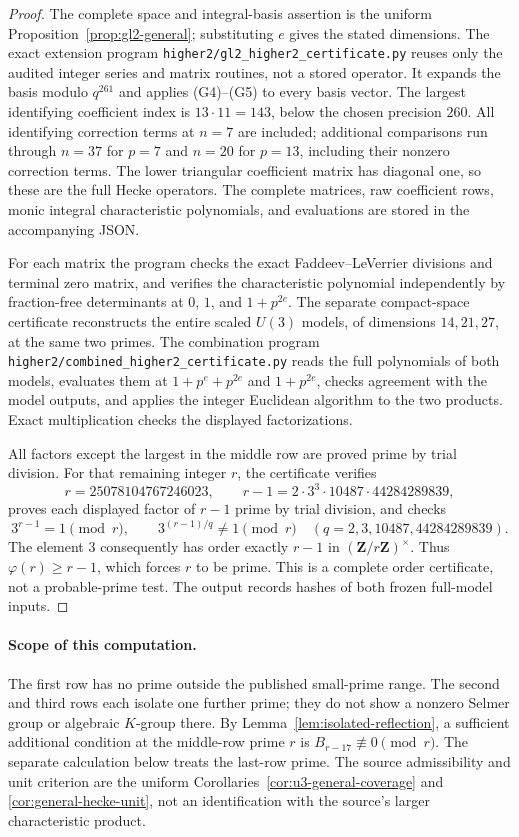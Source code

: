 \begin{proof}
The complete space and integral-basis assertion is the uniform
Proposition~\ref{prop:gl2-general}; substituting $e$ gives the stated
dimensions. The exact extension program
\texttt{higher2/gl2\_higher2\_certificate.py} reuses only the audited
integer series and matrix routines, not a stored operator.
It expands the basis modulo $q^{261}$ and applies (G4)--(G5)
to every basis vector.
The largest identifying coefficient index is $13\cdot11=143$,
below the chosen precision $260$.
All identifying correction terms at $n=7$ are included;
additional comparisons run through $n=37$ for $p=7$ and $n=20$
for $p=13$, including their nonzero correction terms.
The lower triangular coefficient matrix has diagonal one, so these
are the full Hecke operators. The complete matrices, raw coefficient
rows, monic integral characteristic polynomials, and evaluations are
stored in the accompanying JSON.

For each matrix the program checks the exact
Faddeev--LeVerrier divisions and terminal zero matrix, and verifies
the characteristic polynomial independently by fraction-free
determinants at $0$, $1$, and $1+p^{2e}$.
The separate compact-space certificate reconstructs the entire
scaled $U(3)$ models, of dimensions $14,21,27$, at the same two
primes. The combination program
\texttt{higher2/combined\_higher2\_certificate.py} reads the full
polynomials of both models, evaluates them at
$1+p^e+p^{2e}$ and $1+p^{2e}$, checks agreement with the model
outputs, and applies the integer Euclidean algorithm to the two
products. Exact multiplication checks the displayed factorizations.

All factors except the largest in the middle row are proved prime
by trial division. For that remaining integer $r$, the certificate
verifies
\[
 r=25078104767246023,\qquad
 r-1=2\cdot3^3\cdot10487\cdot44284289839,
\]
proves each displayed factor of $r-1$ prime by trial division, and
checks
\[
 3^{r-1}=1\pmod r,\qquad
 3^{(r-1)/q}\ne1\pmod r
 \quad(q=2,3,10487,44284289839).
\]
The element $3$ consequently has order exactly $r-1$ in
$(\mathbf Z/r\mathbf Z)^\times$. Thus $\varphi(r)\ge r-1$,
which forces $r$ to be prime.
This is a complete order certificate, not a probable-prime test.
The output records hashes of both frozen full-model inputs.
\end{proof}

\paragraph{Scope of this computation.}
The first row has no prime outside the published small-prime range.
The second and third rows each isolate one further prime; they do not
show a nonzero Selmer group or algebraic $K$-group there.
By Lemma~\ref{lem:isolated-reflection}, a sufficient additional
condition at the middle-row prime $r$ is
$B_{r-17}\not\equiv0\pmod r$.
The separate calculation below treats the last-row prime.
The source admissibility and unit criterion are the uniform
Corollaries~\ref{cor:u3-general-coverage} and
\ref{cor:general-hecke-unit}, not an identification with the source's
larger characteristic product.
